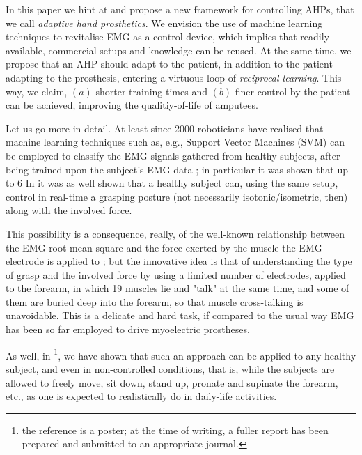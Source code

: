 In this paper we hint at and propose a new framework for controlling
AHPs, that we call \emph{adaptive hand prosthetics}. We envision the
use of machine learning techniques to revitalise EMG as a control
device, which implies that readily available, commercial setups and
knowledge can be reused. At the same time, we propose that an AHP
should adapt to the patient, in addition to the patient adapting to
the prosthesis, entering a virtuous loop of \emph{reciprocal
learning}. This way, we claim, $(a)$ shorter training times and $(b)$
finer control by the patient can be achieved, improving the
qualitiy-of-life of amputees.

Let us go more in detail. At least since 2000 roboticians have
realised that machine learning techniques such as, e.g., Support
Vector Machines (SVM) can be employed to classify the EMG signals
gathered from healthy subjects, after being trained upon the subject's
EMG data \cite{smagt,dunlop}; in particular it was shown that up to
$6$ In \cite{2008.ICRA,2008.BioCyb} it was as well shown that a
healthy subject can, using the same setup, control in real-time a
grasping posture (not necessarily isotonic/isometric, then) along with
the involved force.

This possibility is a consequence, really, of the well-known
relationship between the EMG root-mean square and the force exerted by
the muscle the EMG electrode is applied to \cite{deluca}; but the
innovative idea is that of understanding the type of grasp and the
involved force by using a limited number of electrodes, applied to the
forearm, in which 19 muscles lie and "talk" at the same time, and some
of them are buried deep into the forearm, so that muscle cross-talking
is unavoidable. This is a delicate and hard task, if compared to the
usual way EMG has been so far employed to drive myoelectric
prostheses.

As well, in \cite{2008.GNB}\footnote{the reference is a poster; at the
time of writing, a fuller report has been prepared and submitted to an
appropriate journal.}, we have shown that such an approach can be
applied to any healthy subject, and even in non-controlled conditions,
that is, while the subjects are allowed to freely move, sit down,
stand up, pronate and supinate the forearm, etc., as one is expected
to realistically do in daily-life activities.

